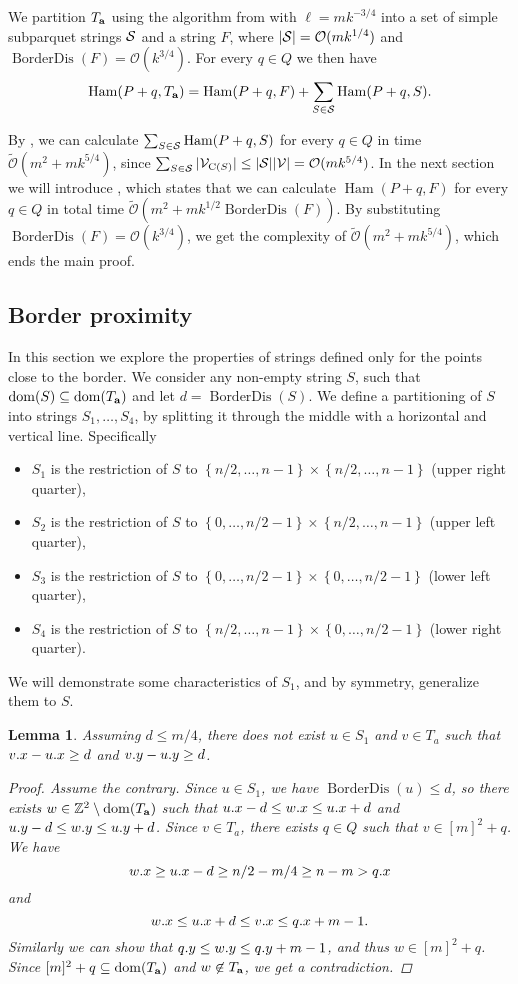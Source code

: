 \documentclass[11pt]{article}
\newcommand{\Z}{\mathbb{Z}}
\renewcommand{\O}{\mathcal{O}}
\newcommand{\tO}{\tilde{\mathcal{O}}}
\newcommand{\set}[1]{\left\lbrace #1 \right\rbrace}
\theoremstyle{plain}
\newtheorem{lemma}{Lemma}
\theoremstyle{definition}
\theoremstyle{remark}
\DeclareMathOperator*{\Ham}{Ham}
\DeclareMathOperator*{\BD}{BorderDis}
\begin{document}
We partition $\Ta$ using the algorithm from  with $\ell = mk^{-3/4}$ into a set of simple subparquet strings $\S$ and a string $F$,
where $|\S| = \O(mk^{1/4})$ and $\BD(F) = \O(k^{3 / 4})$.
For every $q \in Q$ we then have
$$ \Ham(P + q, \Ta) = \Ham(P + q, F) + \sum_{S \in \S} \Ham(P + q, S).$$

By , we can calculate $\sum_{S \in \S} \Ham(P + q, S)$ for every $q \in Q$ in time $\tO(m^2 + mk^{5/4})$,
since $\sum_{S \in \S} |\V_{\getchar{S}}| \le |\S| |\V| = \O(mk^{5/4})$.
In the next section we will introduce , which states that we can calculate $\Ham(P + q, F)$ for every $q \in Q$ in total time $\tO(m^2 + mk^{1/2} \BD(F))$.
By substituting $\BD(F) = \O(k^{3/4})$, we get the complexity of $\tO(m^2 + mk^{5/4})$, which ends the main proof.


\subsection{Border proximity}
In this section we explore the properties of strings defined only for the points close to the border.
We consider any non-empty string $S$, such that $\d{S} \subseteq \d{\Ta}$ and let $d = \BD(S)$.
We define a partitioning of $S$ into strings $S_1, \dots, S_4$, by splitting it through the middle with a horizontal and vertical line. 
Specifically
\begin{itemize}
	\item $S_1$ is the restriction of $S$ to $\set{n / 2, \dots, n - 1} \times \set{n / 2, \dots, n - 1}$ (upper right quarter),
	\item $S_2$ is the restriction of $S$ to $\set{0, \dots, n / 2 - 1} \times \set{n / 2, \dots, n - 1}$ (upper left quarter),
	\item $S_3$ is the restriction of $S$ to $\set{0, \dots, n / 2 - 1} \times \set{0, \dots, n / 2 - 1}$ (lower left quarter),
	\item $S_4$ is the restriction of $S$ to $\set{n / 2, \dots, n - 1} \times \set{0, \dots, n / 2 - 1}$ (lower right quarter).
\end{itemize}
We will demonstrate some characteristics of $S_1$, and by symmetry, generalize them to $S$.

\begin{lemma} \label{border_lemma}
	Assuming $d \le m/4$, there does not exist $u \in S_1$ and $v \in T_a$ such that $\x{v} - \x{u} \ge d$ and $\y{v} - \y{u} \ge d$.
	\begin{proof}
		Assume the contrary.
		Since $u \in S_1$, we have $\BD(u) \le d$, so there exists $w \in \Z^2 \setminus \d{\Ta}$ such that
		$\x{u} - d \le \x{w} \le \x{u} + d$ and
		$\y{u} - d \le \y{w} \le \y{u} + d$.
		Since $v \in T_a$, there exists $q \in Q$ such that $v \in [m]^2 + q$.
		We have
		$$ \x{w} \ge \x{u} - d \ge n / 2 - m / 4 \ge n - m > \x{q} $$
		and
		$$ \x{w} \le \x{u} + d \le \x{v} \le \x{q} + m - 1. $$
		Similarly we can show that $\y{q} \le \y{w} \le \y{q} + m - 1$, and thus $w \in [m]^2 + q$.
		Since $[m]^2 + q \subseteq \d{\Ta}$ and $w \not \in \Ta$, we get a contradiction.
	\end{proof}
\end{lemma}
\end{document}
